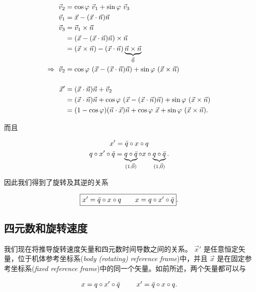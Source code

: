 \begin{align*}
\vec{v}_2 &= \cos\varphi\ \vec{v}_1 + \sin\varphi\ \vec{v}_3 \\
\vec{v}_1 &= \vec{x} - (\vec{x}\cdot\vec{n})\vec{n} \\
\vec{v}_3 &= \vec{v}_1 \c \vec{n}  \\
          &= (\vec{x} - (\vec{x}\cdot\vec{n})\vec{n}) \c \vec{n} \\
          &= (\vec{x}\c\vec{n}) - (\vec{x}\cdot\vec{n})\underbrace{\vec{n}\c\vec{n}}_{\vec{0}} \\
\Rightarrow\ \vec{v}_2 &= \cos\varphi\ (\vec{x} - (\vec{x}\cdot\vec{n})\vec{n}) + \sin\varphi\ (\vec{x}\c\vec{n}) \phantom{\underbrace{1}_{\vec{1}}}\\
\vec{x}'  &= (\vec{x}\cdot\vec{n})\vec{n} + \vec{v}_2 \\
          &= (\vec{x}\cdot\vec{n})\vec{n} + \cos\varphi\ (\vec{x} - (\vec{x}\cdot\vec{n})\vec{n}) + \sin\varphi\ (\vec{x}\c\vec{n}) \\
          &= (1-\cos\varphi)(\vec{n}\cdot\vec{x}) \vec{n}  + \cos\varphi\ \vec{x} + \sin\varphi\ (\vec{x}\c\vec{n}).
\end{align*}

而且

\begin{gather*}
x' = \bar{q} \circ x \circ q \\
q \circ x' \circ \bar{q} = \underbrace{q\circ\bar{q}}_{(1,\vec{0})} \circ x \circ \underbrace{q\circ\bar{q}}_{(1,\vec{0})}.
\end{gather*}

因此我们得到了旋转及其逆的关系

\begin{equation}
\fbox{$x' = \bar{q} \circ x \circ q \\   \qquad  x = q \circ x' \circ \bar{q}$}.
\end{equation}



\subsection{四元数和旋转速度}

我们现在将推导旋转速度矢量和四元数时间导数之间的关系。 $\vec{x}'$ 是任意恒定矢量，位于机体参考坐标系(\emph{body (rotating) reference frame})中，并且 $\vec{x}$ 是在固定参考坐标系(\emph{fixed reference frame})中的同一个矢量。如前所述，两个矢量都可以与

\begin{equation*}
\begin{tabular}{ccc}
$x = q \o x' \o \bar{q}$ &  & $x' = \bar{q} \o x \o q$.
\end{tabular}
\label{eq8}
\end{equation*}

